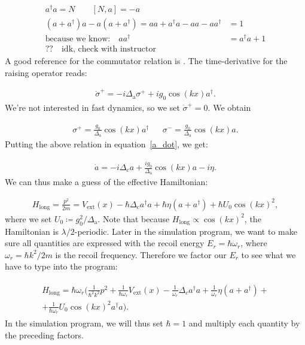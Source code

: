 \begin{align}
a^\dagger a = N \qquad [N, a] = -a \\
(a + a^\dagger) a - a (a + a^\dagger) = aa + a^\dagger a - aa - aa^\dagger & = 1 \\
\text{because we know:} \quad aa^\dagger & = a^\dagger a + 1 \nonumber \\
?? \quad \text{idk, check with instructor}
\end{align}A good reference for the commutator relation is \cite{bertlmann}. The time-derivative for the raising operator reads:

\begin{align}
\dot{\sigma}^+ = -i \Delta_\text{a} \sigma^+ + i g_0 \cos(kx) a^\dagger.
\end{align}We're not interested in fast dynamics, so we set $\dot{\sigma}^+ = 0$. We obtain

\begin{align}
\sigma^+ = \frac{g_0 }{\Delta_\text{a}} \cos(kx) a^\dagger && \sigma^- = \frac{g_0 }{\Delta_\text{a}} \cos(kx) a.
\end{align}Putting the above relation in equation~\ref{a_dot}, we get:

\begin{align}
\dot{a} = -i \Delta_\text{c} a + \frac{i g_0}{\Delta_\text{a}}  \cos(kx) a - i \eta.
\end{align}We can thus make a guess of the effective Hamiltonian:

\begin{align}
H_\text{long} = \frac{p^2}{2m} = V_\text{ext}(x) - \hbar \Delta_\text{c} a^\dagger a + \hbar \eta (a + a^\dagger) + \hbar U_0 \cos(kx)^2,
\end{align}where we set $U_0 \coloneqq g_0^2 / \Delta_\text{a}$. Note that because $H_\text{long} \propto \cos(kx)^2$, the Hamiltonian is $\lambda / 2$-periodic. Later in the simulation program, we want to make sure all quantities are expressed with the recoil energy $E_r = \hbar \omega_r$, where $\omega_r = \hbar k^2 / 2m$ is the recoil frequency. Therefore we factor our $E_r$ to see what we have to type into the program:

\begin{align}
\begin{split}
H_\text{long} = \hbar \omega_r \biggl( \frac{1}{\hbar^2 k^2} p^2 + \frac{1}{\hbar \omega_r} V_\text{ext}(x) - \frac{1}{\omega_r} \Delta_c a^\dagger a + \frac{1}{\omega_r} \eta (a + a^\dagger) + \\
 + \frac{1}{\hbar \omega_r} U_0 \cos(kx)^2 a^\dagger a \biggr).
\end{split}
\end{align}In the simulation program, we will thus set $\hbar = 1$ and multiply each quantity by the preceding factors.

